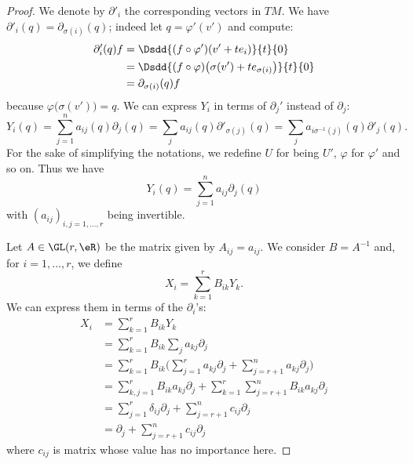 \begin{proof}
	We denote by \( \partial'_i\) the corresponding vectors in \( TM\). We have \( \partial'_i(q)=\partial_{\sigma(i)}(q)\); indeed let \( q=\varphi'(v')\) and compute:
	\begin{subequations}
		\begin{align}
			\partial'_i(q)f & =\Dsdd{ (f\circ\varphi')(v'+te_i) }{t}{0}                            \\
			                & =\Dsdd{ (f\circ\varphi)\big( \sigma(v')+te_{\sigma(i)} \big) }{t}{0} \\
			                & =\partial_{\sigma(i)}(q)f
		\end{align}
	\end{subequations}
	because \( \varphi\big( \sigma(v') \big)=q\). We can express \( Y_i\) in terms of \( \partial_j'\) instead of \( \partial_j\):
	\begin{equation}
		Y_i(q)=\sum_{j=1}^na_{ij}(q)\partial_j(q)=\sum_ja_{ij}(q)\partial'_{\sigma(j)}(q)=\sum_ja_{i\sigma^{-1}(j)}(q)\partial'_j(q).
	\end{equation}
	For the sake of simplifying the notations, we redefine \( U\) for being \( U'\), \( \varphi\) for \( \varphi'\) and so on. Thus we have
	\begin{equation}
		Y_i(q)=\sum_{j=1}^na_{ij}\partial_j(q)
	\end{equation}
	with \( (a_{ij})_{i,j=1,\ldots, r} \) being invertible.

	Let \( A\in \GL(r,\eR)\) be the matrix given by \( A_{ij}=a_{ij}\). We consider \( B=A^{-1}\) and, for \( i=1,\ldots, r\), we define
	\begin{equation}
		X_i=\sum_{k=1}^rB_{ik}Y_k.
	\end{equation}
	We can express them in terms of the \( \partial_i\)'s:
	\begin{subequations}
		\begin{align}
			X_i & =\sum_{k=1}^rB_{ik}Y_k                                                                     \\
			    & =\sum_{k=1}^rB_{ik}\sum_ja_{kj}\partial_j                                                  \\
			    & =\sum_{k=1}^rB_{ik}\big( \sum_{j=1}^ra_{kj}\partial_j+\sum_{j=r+1}^na_{kj}\partial_j \big) \\
			    & =\sum_{k,j=1}^rB_{ik}a_{kj}\partial_j+\sum_{k=1}^r\sum_{j=r+1}^nB_{ik}a_{kj}\partial_j     \\
			    & =\sum_{j=1}^r\delta_{ij}\partial_j+\sum_{j=r+1}^nc_{ij}\partial_j                          \\
			    & =\partial_j+\sum_{j=r+1}^nc_{ij}\partial_j
		\end{align}
	\end{subequations}
	where \( c_{ij}\) is matrix whose value has no importance here.


\end{proof}
